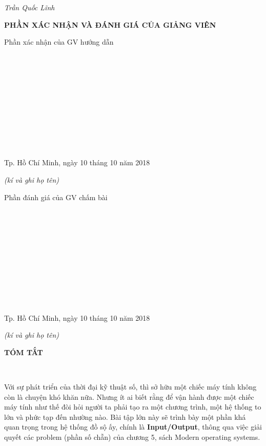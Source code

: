 \documentclass{report}
\begin{document}
\setlength{\parindent}{12cm}
\textit{Trần Quốc Lĩnh}\\



\newpage
\changefontsizes{16pt}
\centerline{\textbf{PHẦN XÁC NHẬN VÀ ĐÁNH GIÁ CỦA GIẢNG VIÊN}}
\bigskip
\changefontsizes{13pt}
\setlength{\parindent}{2.2cm}
Phần xác nhận của GV hướng dẫn

\vspace{0.8cm}
\setlength{\parindent}{1cm}
\ \xfill{1pt} \

\bigskip
\ \xfill{1pt} \

\bigskip
\ \xfill{1pt} \

\bigskip
\ \xfill{1pt} \

\bigskip
\ \xfill{1pt} \

\bigskip
\ \xfill{1pt} \

\changefontsizes{12pt}
\setlength{\parindent}{8cm}
Tp. Hồ Chí Minh, ngày 10 tháng 10 năm 2018

\setlength{\parindent}{11cm}
\textit{(kí và ghi họ tên)}

\changefontsizes{13pt}
\vspace{2.5cm}
\setlength{\parindent}{2.2cm}
Phần đánh giá của GV chấm bài

\vspace{0.8cm}
\setlength{\parindent}{1cm}
\ \xfill{1pt} \

\bigskip
\ \xfill{1pt} \

\bigskip
\ \xfill{1pt} \

\bigskip
\ \xfill{1pt} \

\bigskip
\ \xfill{1pt} \

\bigskip
\ \xfill{1pt} \

\changefontsizes{12pt}
\setlength{\parindent}{8cm}
Tp. Hồ Chí Minh, ngày 10 tháng 10 năm 2018

\setlength{\parindent}{11cm}
\textit{(kí và ghi họ tên)}

\newpage
\changefontsizes{16pt}
\centerline{\textbf{TÓM TẮT}}\

\changefontsizes{13pt}
\setlength{\parindent}{2cm}
Với sự phát triển của thời đại kỹ thuật số, thì sở hữu một chiếc máy tính không còn là chuyện khó khăn nữa. Nhưng ít ai biết rằng để vận hành được một chiếc máy tính như thế đòi hỏi người ta phải tạo ra một chương trình, một hệ thống to lớn và phức tạp đến nhường nào. Bài tập lớn này sẽ trình bày một phần khá quan trọng trong hệ thống đồ sộ ấy, chính là \textbf{Input/Output}, thông qua việc giải quyết các problem (phần số chẵn) của chương 5, sách Modern operating systems.
\end{document}

